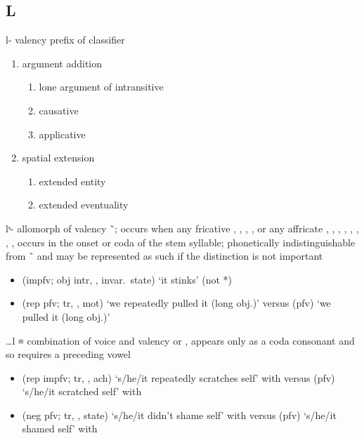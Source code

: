 \subsection{L}\label{sec:alphalist-l}
\begin{morphdesc}[resume*=alphalist]
\item[l-]\label{m:l-}
	valency prefix of classifier
	\begin{enumerate}
	\item	argument addition
		\begin{enumerate}
		\item	lone argument of intransitive
		\item	causative
		\item	applicative
		\end{enumerate}
	\item	spatial extension
		\begin{enumerate}
		\item	extended entity
		\item	extended eventuality
		\end{enumerate}
	\end{enumerate}

\item[lˢ-]\label{m:lˢ-}
	allomorph of valency  \~\ ;
	occurs when any fricative
		, , , , 
	or any affricate
		, , ,
		, , ,
		, , 
	occurs in the onset or coda of the stem syllable;
	phonetically indistinguishable from  \~\  and may be represented as such
	if the distinction is not important
	\begin{itemize}
	\item	{} (impfv; obj intr, ,  invar.\ state) ‘it stinks’
		(not *)
	\item	{} (rep pfv; tr, , mot) ‘we repeatedly pulled it (long obj.)’\newline
		versus  (pfv) ‘we pulled it (long obj.)’
	\end{itemize}

\item[…l]\label{m:…l}
	≡ 
	combination of voice 
		and valency  or ,
	appears only as a coda consonant and so requires a preceding vowel
	\begin{itemize}
	\item	{} (rep impfv; tr, , ach) ‘s/he/it repeatedly scratches self’
			with \newline
		versus  (pfv) ‘s/he/it scratched self’
			with 
	\item	{} (neg pfv; tr, ,  state) ‘s/he/it didn’t shame self’
			with 
		versus  (pfv) ‘s/he/it shamed self’
			with 
	\end{itemize}


\end{morphdesc}

